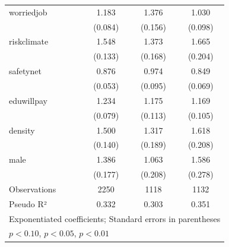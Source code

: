 \begin{table}[htbp]
\begin{tabular}{l*{3}{c}}
\addlinespace
worriedjob  &       1.183\sym{**} &       1.376\sym{***}&       1.030         \\
            &     (0.084)         &     (0.156)         &     (0.098)         \\
\addlinespace
riskclimate &       1.548\sym{***}&       1.373\sym{***}&       1.665\sym{***}\\
            &     (0.133)         &     (0.168)         &     (0.204)         \\
\addlinespace
safetynet   &       0.876\sym{**} &       0.974         &       0.849\sym{**} \\
            &     (0.053)         &     (0.095)         &     (0.069)         \\
\addlinespace
eduwillpay  &       1.234\sym{***}&       1.175\sym{*}  &       1.169\sym{*}  \\
            &     (0.079)         &     (0.113)         &     (0.105)         \\
\addlinespace
density     &       1.500\sym{***}&       1.317\sym{*}  &       1.618\sym{***}\\
            &     (0.140)         &     (0.189)         &     (0.208)         \\
\addlinespace
male        &       1.386\sym{**} &       1.063         &       1.586\sym{***}\\
            &     (0.177)         &     (0.208)         &     (0.278)         \\
\midrule
Observations&        2250         &        1118         &        1132         \\
Pseudo R²  &       0.332         &       0.303         &       0.351         \\
\bottomrule
\multicolumn{4}{l}{\footnotesize Exponentiated coefficients; Standard errors in parentheses}\\
\multicolumn{4}{l}{\footnotesize \sym{*} \(p<0.10\), \sym{**} \(p<0.05\), \sym{***} \(p<0.01\)}\\
\end{tabular}
\end{table}
